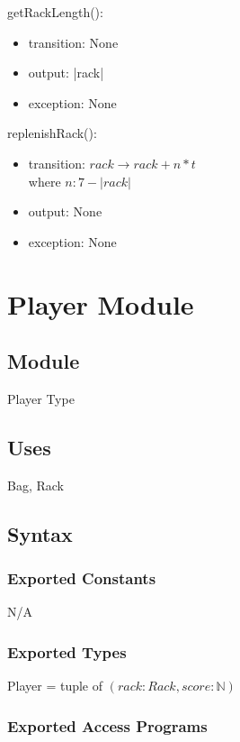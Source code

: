 \documentclass[12pt]{article}
\begin{document}
\noindent getRackLength():
\begin{itemize}
\item transition: None
\item output: |rack|
\item exception: None
\end{itemize}

\noindent replenishRack():
\begin{itemize}
\item transition: $rack \rightarrow rack + n*t$ \\
        where $n : 7 - |rack|$
\item output: None
\item exception: None
\end{itemize}
\medskip
\newpage

\section* {Player Module}

\subsection*{Module}

Player Type

\subsection* {Uses}

Bag, Rack

\subsection* {Syntax}

\subsubsection* {Exported Constants}
N/A
\subsubsection* {Exported Types}

Player = tuple of $(rack: Rack, score:\mathbb{N})$

\subsubsection* {Exported Access Programs}
\end{document}
